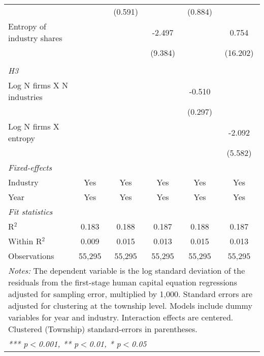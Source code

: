\begin{tabular}{lccccc}
                                        &                 & (0.591)         &                 & (0.884)         &   \\   
   Entropy of industry shares           &                 &                 & -2.497          &                 & 0.754\\   
                                        &                 &                 & (9.384)         &                 & (16.202)\\   
\hdashline %
\\[0.1ex] %
\emph{H3} \\ 
   Log N firms X N industries           &                 &                 &                 & -0.510          &   \\   
                                        &                 &                 &                 & (0.297)         &   \\   
   Log N firms X entropy                &                 &                 &                 &                 & -2.092\\   
                                        &                 &                 &                 &                 & (5.582)\\   
   \midrule
   \emph{Fixed-effects}\\
   Industry                             & Yes             & Yes             & Yes             & Yes             & Yes\\  
   Year                                 & Yes             & Yes             & Yes             & Yes             & Yes\\  
   \midrule
   \emph{Fit statistics}\\
   R$^2$                                & 0.183           & 0.188           & 0.187           & 0.188           & 0.187\\  
   Within R$^2$                         & 0.009           & 0.015           & 0.013           & 0.015           & 0.013\\  
   Observations                         & 55,295          & 55,295          & 55,295          & 55,295          & 55,295\\  
   \midrule \midrule
\multicolumn{6}{p{16cm}}{\emph{Notes:} The dependent variable is the log 
    standard deviation of the residuals from the first-stage human capital equation 
    regressions adjusted for sampling error, multiplied by 1,000. Standard errors 
    are adjusted for clustering at the township level. Models include dummy variables 
    for year and industry. Interaction effects are centered. Clustered (Township) 
    standard-errors in parentheses.}\\
\multicolumn{6}{l}{\emph{*** p$<$0.001, ** p$<$0.01, * p$<$0.05}} \\ 
\end{tabular}
\par\endgroup
